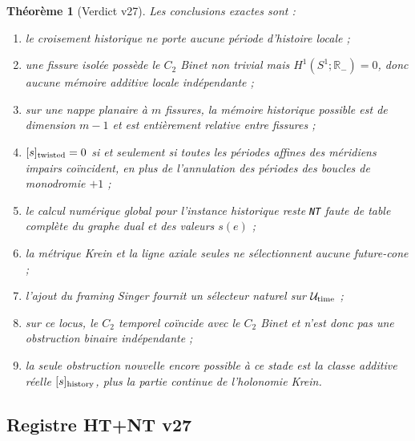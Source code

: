 \documentclass[11pt,a4paper]{article}
\newtheorem{theorem}{Théorème}[section]
\newcommand{\certNT}{\texttt{NT}}
\begin{document}
\begin{theorem}[Verdict v27]\label{thm:v27-verdict}
Les conclusions exactes sont :
\begin{enumerate}[label=\textup{(\roman*)}]
\item le croisement historique ne porte aucune période d'histoire locale ;
\item une fissure isolée possède le $C_2$ Binet non trivial mais $H^1(S^1;\mathbb R_-)=0$, donc aucune mémoire additive locale indépendante ;
\item sur une nappe planaire à $m$ fissures, la mémoire historique possible est de dimension $m-1$ et est entièrement relative entre fissures ;
\item $[s]_{\rm twisted}=0$ si et seulement si toutes les périodes affines des méridiens impairs coïncident, en plus de l'annulation des périodes des boucles de monodromie $+1$ ;
\item le calcul numérique global pour l'instance historique reste \certNT{} faute de table complète du graphe dual et des valeurs $s(e)$ ;
\item la métrique Krein et la ligne axiale seules ne sélectionnent aucune future-cone ;
\item l'ajout du framing Singer fournit un sélecteur naturel sur $\mathcal U_{\rm time}$ ;
\item sur ce locus, le $C_2$ temporel coïncide avec le $C_2$ Binet et n'est donc pas une obstruction binaire indépendante ;
\item la seule obstruction nouvelle encore possible à ce stade est la classe additive réelle $[s]_{\rm history}$, plus la partie continue de l'holonomie Krein.
\end{enumerate}
\end{theorem}

\subsection{Registre HT+NT v27}
\end{document}

